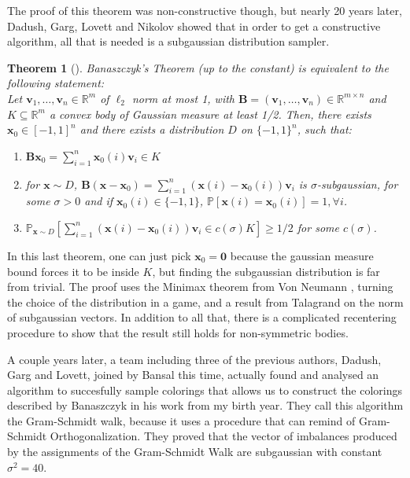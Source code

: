 \documentclass[12pt]{article}
\newtheorem{theorem}{Theorem}
\begin{document}
The proof of this theorem was non-constructive though, but nearly 20 years later, Dadush, Garg, Lovett and Nikolov showed that in order to get a constructive algorithm, all that is needed is a subgaussian distribution sampler. 

\begin{theorem}[\cite{construct}]\label{equivalence}
Banaszczyk's Theorem (up to the constant) is equivalent to the following statement:\\
Let $\textbf{v}_1, \dots, \textbf{v}_n \in \mathbb{R}^m$ of $\ell_2$ norm at most 1, with $\textbf{B}= (\textbf{v}_1, \dots, \textbf{v}_n) \in \mathbb{R}^{m \times n}$ and $K \subseteq \mathbb{R}^m$ a convex body  of Gaussian measure at least 1/2.
Then, there exists $\textbf{x}_0 \in [-1,1]^n$ and there exists a distribution $D$ on $\{-1,1\}^n$, such that: 
\begin{enumerate}
    \item  $\textbf{B}\textbf{x}_0 = \sum_{i=1}^n \textbf{x}_0(i)\textbf{v}_i \in K$\\
    \item  for $\textbf{x} \sim D$, $\textbf{B}(\textbf{x}-\textbf{x}_0)= \sum_{i=1}^n (\textbf{x}(i)-\textbf{x}_0(i))\textbf{v}_i$ is $\sigma$-subgaussian, for some $\sigma >0$ and if $\textbf{x}_0(i) \in \{-1, 1\}$, $\mathbb{P}[\textbf{x}(i)=\textbf{x}_0(i)]=1, \forall i$.
    \item $\mathbb{P}_{\textbf{x} \sim D}[\sum_{i=1}^n (\textbf{x}(i)- \textbf{x}_0(i))\textbf{v}_i \in c(\sigma)K] \geq 1/2$ for some $c(\sigma)$.
\end{enumerate}
\end{theorem}
In this last theorem, one can just pick $\textbf{x}_0=\textbf{0}$ because the gaussian measure bound forces it to be inside $K$, but finding the subgaussian distribution is far from trivial. The proof uses the Minimax theorem from Von Neumann \cite{neumann1928theorie}, turning the choice of the distribution in a game, and a result from Talagrand \cite{talagrand2005generic} on the norm of subgaussian vectors. In addition to all that, there is a complicated recentering procedure to show that the result still holds for non-symmetric bodies.

A couple years later, a team including three of the previous authors, Dadush, Garg and Lovett, joined by Bansal this time, actually found and analysed an algorithm to succesfully sample colorings that allows us to construct the colorings described by Banaszczyk in his work from my birth year. They call this algorithm the Gram-Schmidt walk, because it uses a procedure that can remind of Gram-Schmidt Orthogonalization. They proved that the vector of imbalances produced by the assignments of the Gram-Schmidt Walk are subgaussian with constant $\sigma^2=40$.
\end{document}
